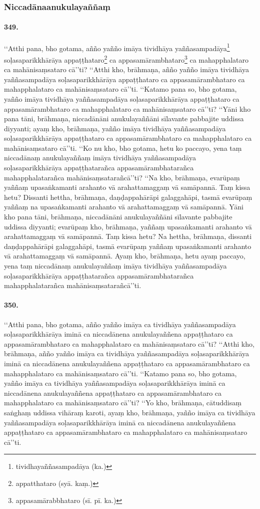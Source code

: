 \subsubsection{Niccadānaanukulayaññaṃ}

\paragraph{349.} ‘‘Atthi pana, bho gotama, añño yañño imāya tividhāya yaññasampadāya\footnote{tividhayaññasampadāya (ka.)} soḷasaparikkhārāya appaṭṭhataro\footnote{appatthataro (syā. kaṃ.)} ca appasamārambhataro\footnote{appasamārabbhataro (sī. pī. ka.)} ca mahapphalataro ca mahānisaṃsataro cā’’ti? ‘‘Atthi kho, brāhmaṇa, añño yañño imāya tividhāya yaññasampadāya soḷasaparikkhārāya appaṭṭhataro ca appasamārambhataro ca mahapphalataro ca mahānisaṃsataro cā’’ti. ‘‘Katamo pana so, bho gotama, yañño imāya tividhāya yaññasampadāya soḷasaparikkhārāya appaṭṭhataro ca appasamārambhataro ca mahapphalataro ca mahānisaṃsataro cā’’ti? ‘‘Yāni kho pana tāni, brāhmaṇa, niccadānāni anukulayaññāni sīlavante pabbajite uddissa diyyanti; ayaṃ kho, brāhmaṇa, yañño imāya tividhāya yaññasampadāya soḷasaparikkhārāya appaṭṭhataro ca appasamārambhataro ca mahapphalataro ca mahānisaṃsataro cā’’ti. ‘‘Ko nu kho, bho gotama, hetu ko paccayo, yena taṃ niccadānaṃ anukulayaññaṃ imāya tividhāya yaññasampadāya soḷasaparikkhārāya appaṭṭhatarañca appasamārambhatarañca mahapphalatarañca mahānisaṃsatarañcā’’ti? ‘‘Na kho, brāhmaṇa, evarūpaṃ yaññaṃ upasaṅkamanti arahanto vā arahattamaggaṃ vā samāpannā. Taṃ kissa hetu? Dissanti hettha, brāhmaṇa, daṇḍappahārāpi galaggahāpi, tasmā evarūpaṃ yaññaṃ na upasaṅkamanti arahanto vā arahattamaggaṃ vā samāpannā. Yāni kho pana tāni, brāhmaṇa, niccadānāni anukulayaññāni sīlavante pabbajite uddissa diyyanti; evarūpaṃ kho, brāhmaṇa, yaññaṃ upasaṅkamanti arahanto vā arahattamaggaṃ vā samāpannā. Taṃ kissa hetu? Na hettha, brāhmaṇa, dissanti daṇḍappahārāpi galaggahāpi, tasmā evarūpaṃ yaññaṃ upasaṅkamanti arahanto vā arahattamaggaṃ vā samāpannā. Ayaṃ kho, brāhmaṇa, hetu ayaṃ paccayo, yena taṃ niccadānaṃ anukulayaññaṃ imāya tividhāya yaññasampadāya soḷasaparikkhārāya appaṭṭhatarañca appasamārambhatarañca mahapphalatarañca mahānisaṃsatarañcā’’ti.

\paragraph{350.} ‘‘Atthi pana, bho gotama, añño yañño imāya ca tividhāya yaññasampadāya soḷasaparikkhārāya iminā ca niccadānena anukulayaññena appaṭṭhataro ca appasamārambhataro ca mahapphalataro ca mahānisaṃsataro cā’’ti? ‘‘Atthi kho, brāhmaṇa, añño yañño imāya ca tividhāya yaññasampadāya soḷasaparikkhārāya iminā ca niccadānena anukulayaññena appaṭṭhataro ca appasamārambhataro ca mahapphalataro ca mahānisaṃsataro cā’’ti. ‘‘Katamo pana so, bho gotama, yañño imāya ca tividhāya yaññasampadāya soḷasaparikkhārāya iminā ca niccadānena anukulayaññena appaṭṭhataro ca appasamārambhataro ca mahapphalataro ca mahānisaṃsataro cā’’ti? ‘‘Yo kho, brāhmaṇa, cātuddisaṃ saṅghaṃ uddissa vihāraṃ karoti, ayaṃ kho, brāhmaṇa, yañño imāya ca tividhāya yaññasampadāya soḷasaparikkhārāya iminā ca niccadānena anukulayaññena appaṭṭhataro ca appasamārambhataro ca mahapphalataro ca mahānisaṃsataro cā’’ti.

